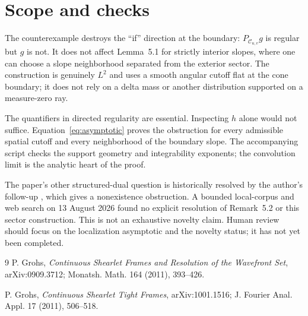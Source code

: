 \documentclass[11pt]{article}
\newcommand{\C}{\mathcal C}
\begin{document}
\section{Scope and checks}

The counterexample destroys the ``if'' direction at the boundary:
$P_{\C_{u,v}}g$ is regular but $g$ is not. It does not affect Lemma~5.1 for
strictly interior slopes, where one can choose a slope neighborhood separated
from the exterior sector. The construction is genuinely $L^2$ and uses a
smooth angular cutoff flat at the cone boundary; it does not rely on a delta
mass or another distribution supported on a measure-zero ray.

The quantifiers in directed regularity are essential. Inspecting $h$ alone
would not suffice. Equation~\eqref{eq:asymptotic} proves the obstruction for
every admissible spatial cutoff and every neighborhood of the boundary slope.
The accompanying script checks the support geometry and integrability
exponents; the convolution limit is the analytic heart of the proof.

The paper's other structured-dual question is historically resolved by the
author's follow-up \cite{GrohsTight}, which gives a nonexistence obstruction.
A bounded local-corpus and web search on 13 August 2026 found no explicit
resolution of Remark~5.2 or this sector construction. This is not an
exhaustive novelty claim. Human review should focus on the localization
asymptotic and the novelty status; it has not yet been completed.

\begin{thebibliography}{9}
P. Grohs, \emph{Continuous Shearlet Frames and Resolution of the Wavefront
Set}, arXiv:0909.3712; Monatsh. Math. 164 (2011), 393--426.

P. Grohs, \emph{Continuous Shearlet Tight Frames}, arXiv:1001.1516;
J. Fourier Anal. Appl. 17 (2011), 506--518.
\end{thebibliography}
\end{document}
